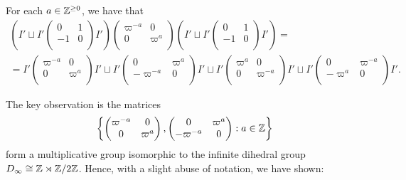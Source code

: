 \begin{lemma}
    For each $a\in\mathbb{Z}^{\geq0}$, we have that
    \begin{align*}
        \left(I'\sqcup I'\begin{pmatrix}
            0 & 1\\
            -1 & 0\\
        \end{pmatrix}I'\right)\begin{pmatrix}
            \varpi^{-a} & 0\\
            0 & \varpi^a \\
        \end{pmatrix}\left(I'\sqcup I'\begin{pmatrix}
            0 & 1\\
            -1 & 0\\
        \end{pmatrix}I'\right)=\\
        =I'\begin{pmatrix}
            \varpi^{-a} & 0\\
            0 & \varpi^a\\
        \end{pmatrix}I'\sqcup I'\begin{pmatrix}
            0 & \varpi^a\\
            -\varpi^{-a} & 0\\
        \end{pmatrix}I'\sqcup I'\begin{pmatrix}
            \varpi^{a} & 0\\
            0 & \varpi^{-a}\\
        \end{pmatrix}I'\sqcup I'\begin{pmatrix}
            0 & \varpi^{-a}\\
            -\varpi^a & 0\\
        \end{pmatrix}I'.
    \end{align*} 
    
\end{lemma}

The key observation is the matrices $$\left\{\begin{pmatrix}
    \varpi^{-a} & 0\\
    0 & \varpi^a\\
\end{pmatrix},\begin{pmatrix}
    0 & \varpi^a\\
    -\varpi^{-a} & 0\\
\end{pmatrix}:a\in\mathbb{Z}\right\}$$
form a multiplicative group isomorphic to the infinite dihedral group $D_\infty\cong\mathbb{Z}\rtimes\mathbb{Z}/2\mathbb{Z}$. Hence, with a slight abuse of notation, we have shown:

